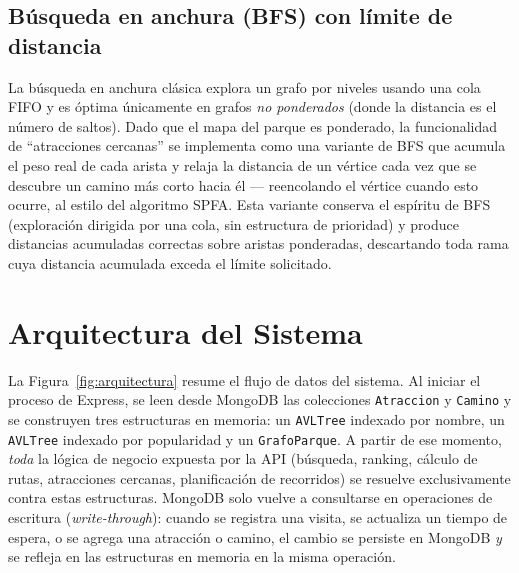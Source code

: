 \documentclass[conference]{IEEEtran}
\begin{document}
\subsection{B\'usqueda en anchura (BFS) con l\'imite de distancia}

La b\'usqueda en anchura cl\'asica explora un grafo por niveles usando una
cola FIFO y es \'optima \'unicamente en grafos \emph{no ponderados} (donde la
distancia es el n\'umero de saltos). Dado que el mapa del parque es ponderado,
la funcionalidad de ``atracciones cercanas'' se implementa como una variante
de BFS que acumula el peso real de cada arista y relaja la distancia de un
v\'ertice cada vez que se descubre un camino m\'as corto hacia \'el
--- reencolando el v\'ertice cuando esto ocurre, al estilo del algoritmo SPFA.
Esta variante conserva el esp\'iritu de BFS (exploraci\'on dirigida por una
cola, sin estructura de prioridad) y produce distancias acumuladas correctas
sobre aristas ponderadas, descartando toda rama cuya distancia acumulada
exceda el l\'imite solicitado.

\section{Arquitectura del Sistema}

La Figura~\ref{fig:arquitectura} resume el flujo de datos del sistema. Al
iniciar el proceso de Express, se leen desde MongoDB las colecciones
\texttt{Atraccion} y \texttt{Camino} y se construyen tres estructuras en
memoria: un \texttt{AVLTree} indexado por nombre, un \texttt{AVLTree}
indexado por popularidad y un \texttt{GrafoParque}. A partir de ese momento,
\emph{toda} la l\'ogica de negocio expuesta por la API (b\'usqueda, ranking,
c\'alculo de rutas, atracciones cercanas, planificaci\'on de recorridos) se
resuelve exclusivamente contra estas estructuras. MongoDB solo vuelve a
consultarse en operaciones de escritura (\emph{write-through}): cuando se
registra una visita, se actualiza un tiempo de espera, o se agrega una
atracci\'on o camino, el cambio se persiste en MongoDB \emph{y} se refleja en
las estructuras en memoria en la misma operaci\'on.
\end{document}
